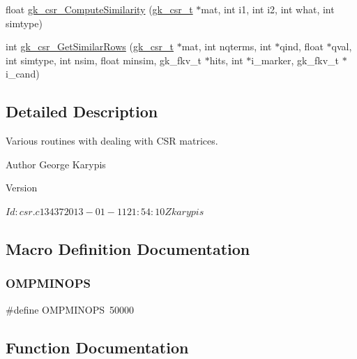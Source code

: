 \begin{DoxyCompactItemize}
\item 
float \hyperlink{a00023_a86d96bf7b4f265b0e4a3b244ba031b0d}{gk\+\_\+csr\+\_\+\+Compute\+Similarity} (\hyperlink{a00634}{gk\+\_\+csr\+\_\+t} $\ast$mat, int i1, int i2, int what, int simtype)
\item 
int \hyperlink{a00023_a601a4baa00acee0a9c446a4c6f5ac394}{gk\+\_\+csr\+\_\+\+Get\+Similar\+Rows} (\hyperlink{a00634}{gk\+\_\+csr\+\_\+t} $\ast$mat, int nqterms, int $\ast$qind, float $\ast$qval, int simtype, int nsim, float minsim, gk\+\_\+fkv\+\_\+t $\ast$hits, int $\ast$i\+\_\+marker, gk\+\_\+fkv\+\_\+t $\ast$i\+\_\+cand)
\end{DoxyCompactItemize}


\subsection{Detailed Description}
Various routines with dealing with C\+SR matrices. 

\begin{DoxyAuthor}{Author}
George Karypis 
\end{DoxyAuthor}
\begin{DoxyVersion}{Version}
\begin{DoxyVerb}$Id: csr.c 13437 2013-01-11 21:54:10Z karypis $ \end{DoxyVerb}
 
\end{DoxyVersion}


\subsection{Macro Definition Documentation}
\mbox{\label{a00023_afbb5013b831efde4d664bae299d7d2ee}} 
\subsubsection{\texorpdfstring{O\+M\+P\+M\+I\+N\+O\+PS}{OMPMINOPS}}
{\footnotesize\ttfamily \#define O\+M\+P\+M\+I\+N\+O\+PS~50000}



\subsection{Function Documentation}
\mbox{\label{a00023_a3e15963be76870160707368a5fe7f693}} 
